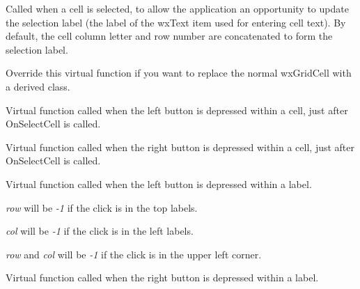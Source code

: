 

Called when a cell is selected, to allow the application an
opportunity to update the selection label (the label of the wxText item
used for entering cell text). By default, the cell column letter and row
number are concatenated to form the selection label.



Override this virtual function if you want to replace the normal wxGridCell with a derived
class.



Virtual function called when the left button is depressed within a cell, just after OnSelectCell is called.



Virtual function called when the right button is depressed within a cell, just after OnSelectCell is called.



Virtual function called when the left button is depressed within a
label.  

{\it row} will be {\it -1} if the click is in the top labels.

{\it col} will be {\it -1} if the click is in the left labels.

{\it row} and {\it col} will be {\it -1} if the click is in the upper
left corner.



Virtual function called when the right button is depressed within a label.

